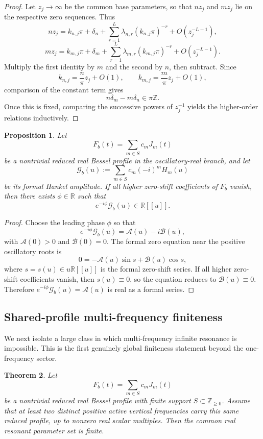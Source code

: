 \documentclass[11pt,reqno]{amsart}
\newtheorem{theorem}{Theorem}[section]
\newtheorem{proposition}[theorem]{Proposition}
\theoremstyle{definition}
\newcommand{\R}{\mathbb{R}}
\newcommand{\Z}{\mathbb{Z}}
\begin{document}
\begin{proof}
Let $z_j\to\infty$ be the common base parameters, so that $nz_j$ and $mz_j$ lie on the
respective zero sequences. Thus
\[
n z_j
=
k_{n,j}\pi+\delta_n+\sum_{r=1}^L \lambda_{n,r}(k_{n,j}\pi)^{-r}+O(z_j^{-L-1}),
\]
\[
m z_j
=
k_{m,j}\pi+\delta_m+\sum_{r=1}^L \lambda_{m,r}(k_{m,j}\pi)^{-r}+O(z_j^{-L-1}).
\]
Multiply the first identity by $m$ and the second by $n$, then subtract. Since
\[
k_{n,j}=\frac{n}{\pi}z_j+O(1),
\qquad
k_{m,j}=\frac{m}{\pi}z_j+O(1),
\]
comparison of the constant term gives
\[
n\delta_m-m\delta_n\in\pi\Z.
\]
Once this is fixed, comparing the successive powers of $z_j^{-1}$ yields the higher-order
relations inductively.
\end{proof}

\begin{proposition}\label{prop:formal-phase-purity-paper}
Let
\[
F_b(t)=\sum_{m\in S} c_m J_m(t)
\]
be a nontrivial reduced real Bessel profile in the oscillatory-real branch, and let
\[
\mathcal G_b(u):=\sum_{m\in S} c_m (-i)^m H_m(u)
\]
be its formal Hankel amplitude. If all higher zero-shift coefficients of $F_b$ vanish, then
there exists $\phi\in\R$ such that
\[
e^{-i\phi}\mathcal G_b(u)\in\R[[u]].
\]
\end{proposition}

\begin{proof}
Choose the leading phase $\phi$ so that
\[
e^{-i\phi}\mathcal G_b(u)=\mathcal A(u)-i\mathcal B(u),
\]
with $\mathcal A(0)>0$ and $\mathcal B(0)=0$. The formal zero equation near the positive
oscillatory roots is
\[
0=-\mathcal A(u)\sin s+\mathcal B(u)\cos s,
\]
where $s=s(u)\in u\R[[u]]$ is the formal zero-shift series. If all higher zero-shift
coefficients vanish, then $s(u)\equiv 0$, so the equation reduces to $\mathcal B(u)\equiv 0$.
Therefore $e^{-i\phi}\mathcal G_b(u)=\mathcal A(u)$ is real as a formal series.
\end{proof}

\subsection*{Shared-profile multi-frequency finiteness}

We next isolate a large class in which multi-frequency infinite resonance is impossible. This is
the first genuinely global finiteness statement beyond the one-frequency sector.

\begin{theorem}\label{thm:shared-profile-finite}
Let
\[
F_b(t)=\sum_{m\in S} c_m J_m(t)
\]
be a nontrivial reduced real Bessel profile with finite support
$S\subset\Z_{\ge 0}$. Assume that at least two distinct positive active vertical frequencies
carry this same reduced profile, up to nonzero real scalar multiples. Then the common real
resonant parameter set is finite.
\end{theorem}
\end{document}
